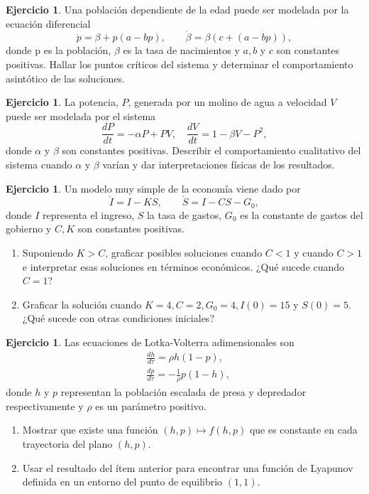 \documentclass[12pt, a4paper]{amsbook}
\theoremstyle{remark}
\theoremstyle{definition}
\newtheorem{ejer}[teo]{Ejercicio}
\numberwithin{section}{chapter}
\numberwithin{subsection}{section}
\numberwithin{equation}{section}
\numberwithin{figure}{chapter}
\begin{document}
\begin{ejer}
Una población dependiente de la edad puede ser modelada por la ecuación diferencial
$$
\dot p = \beta + p(a - bp),\qquad  \dot \beta = \beta (c + (a - bp)),
$$
donde p es la población, $\beta$ es la tasa de nacimientos y $a, b$ y $c$ son constantes positivas. Hallar los puntos críticos del sistema y determinar el comportamiento asintótico de las soluciones.
\end{ejer}

\begin{ejer}
La potencia, $P$, generada por un molino de agua a velocidad $V$ puede ser modelada por el sistema
$$
\frac{dP}{dt} = -\alpha P + PV,\quad  \frac{dV}{dt} = 1- \beta V - P^2,
$$
donde $\alpha$ y $\beta$ son constantes positivas. Describir el comportamiento cualitativo del sistema cuando $\alpha$ y $\beta$ varían y dar interpretaciones físicas de los resultados.
\end{ejer}

\begin{ejer}
Un modelo muy simple de la economía  viene dado por
$$
\dot I = I - KS,\qquad  \dot S= I - CS - G_0,
$$
donde $I$ representa el ingreso, $S$ la tasa de gastos, $G_0$ es la constante de gastos del gobierno y $C, K$ son constantes positivas.
\begin{enumerate}
\item Suponiendo $K>C$, graficar posibles soluciones cuando $C<1$ y cuando $C>1$ e interpretar esas soluciones en términos económicos. ¿Qué sucede cuando $C=1$?
\item Graficar la solución cuando $K = 4, C = 2, G_0 = 4, I(0) = 15$ y $S(0) = 5$. ¿Qué sucede con otras condiciones iniciales?
\end{enumerate}
\end{ejer}

\begin{ejer}
Las ecuaciones de Lotka-Volterra adimensionales son
\begin{align*}
&\frac{dh}{d\tau} = \rho h(1-p),\\
&\frac{dp}{d\tau} = -\frac{1}{\rho} p (1-h),
\end{align*}
donde $h$ y $p$ representan la población escalada de presa y depredador respectivamente y $\rho$ es un parámetro positivo.
\begin{enumerate}
\item Mostrar que existe una función $(h, p)\mapsto f(h, p)$ que es constante en cada trayectoria del plano $(h, p)$.
\item Usar el resultado del ítem anterior para encontrar una función de Lyapunov definida en un entorno del punto de equilibrio $(1,1)$.
\end{enumerate}
\end{ejer}
\end{document}
